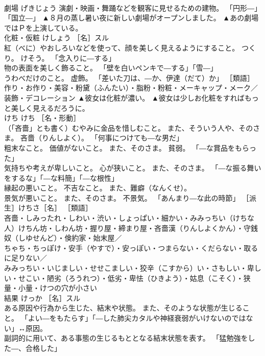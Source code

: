 \documentclass[8pt]{extreport}
\begin{document}
\begin{CJK}{UTF8}{min}
\\	劇場	げきじょう	演劇・映画・舞踊などを観客に見せるための建物。 「円形―」「国立―」	▲８月の蒸し暑い夜に新しい劇場がオープンしました。 ▲あの劇場ではＰを上演している。
\\	化粧・仮粧	けしょう	［名］スル 
\\	紅（べに）やおしろいなどを使って、顔を美しく見えるようにすること。 つくり。 けそう。 「念入りに―する」 
\\	物の表面を美しく飾ること。 「壁を白いペンキで―する」「雪―」 
\\	うわべだけのこと。 虚飾。 「差いた刀は、―か、伊達（だて）か」 ［類語］
\\	作り・お作り・美容・粉黛（ふんたい）・脂粉・粉粧・メーキャップ・メーク／
\\	装飾・デコレーション	▲彼女は化粧が濃い。 ▲彼女は少しお化粧をすればもっと美しく見えるだろうに。
\\	けち	けち	［名・形動］ 
\\	（「吝嗇」とも書く）むやみに金品を惜しむこと。 また、そういう人や、そのさま。 吝嗇（りんしよく）。 「何事につけても―な男だ」 
\\	粗末なこと。 価値がないこと。 また、そのさま。 貧弱。 「―な賞品をもらった」 
\\	気持ちや考えが卑しいこと。 心が狭いこと。 また、そのさま。 「―な振る舞いをするな」「―な料簡」「―な根性」 
\\	縁起の悪いこと。 不吉なこと。 また、難癖（なんくせ）。 
\\	景気が悪いこと。 また、そのさま。 不景気。 「あんまり―な此の時節」 ［派生］けちさ［名］ ［類語］
\\	吝嗇・しみったれ・しわい・渋い・しょっぱい・細かい・みみっちい（けちな人）けちん坊・しわん坊・握り屋・締まり屋・吝嗇漢（りんしよくかん）・守銭奴（しゆせんど）・倹約家・始末屋／
\\	ちゃち・ちっぽけ・安手（やすで）・安っぽい・つまらない・くだらない・取るに足りない／
\\	みみっちい・いじましい・せせこましい・狡辛（こすから）い・さもしい・卑しい・せこい・陋劣（ろうれつ）・低劣・卑怯（ひきよう）・姑息（こそく）・狭量・小量・けつの穴が小さい	
\\	結果	けっか	［名］スル 
\\	ある原因や行為から生じた、結末や状態。 また、そのような状態が生じること。 「よい―をもたらす」「―した肺尖カタルや神経衰弱がいけないのではない」↔原因。 
\\	副詞的に用いて、ある事態の生じるもととなる結末状態を表す。 「猛勉強をした―、合格した」 

\end{CJK}
\end{document}
